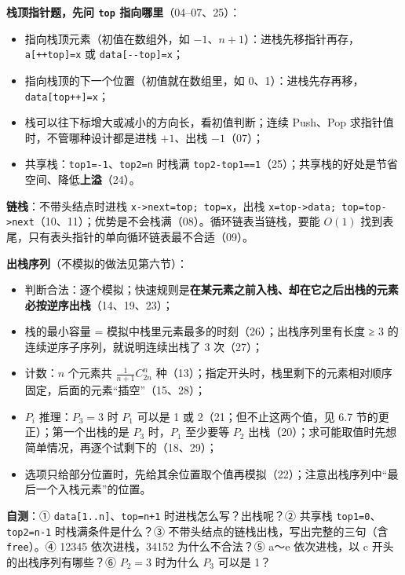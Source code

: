 \documentclass[10.5pt,a4paper,oneside]{article}
\newcommand{\hlred}[1]{\textcolor{wdred}{\bfseries #1}}
\providecommand{\tightlist}{\setlength{\itemsep}{2pt}\setlength{\parskip}{0pt}}
\begin{document}
\begin{summarybox}

\textbf{栈顶指针题，先问 \texttt{top} 指向哪里}（04--07、25）：

\begin{itemize}
\tightlist
\item
  指向栈顶元素（初值在数组外，如
  \(-1\)、\(n+1\)）：进栈先移指针再存，\texttt{a{[}++top{]}=x} 或
  \texttt{data{[}-\/-top{]}=x}；
\item
  指向栈顶的下一个位置（初值就在数组里，如
  0、1）：进栈先存再移，\texttt{data{[}top++{]}=x}；
\item
  栈可以往下标增大或减小的方向长，看初值判断；连续 Push、Pop
  求指针值时，不管哪种设计都是进栈 \(+1\)、出栈 \(-1\)（07）；
\item
  共享栈：\texttt{top1=-1}、\texttt{top2=n} 时栈满
  \texttt{top2-top1==1}（25）；共享栈的好处是节省空间、降低\textbf{上溢}（24）。
\end{itemize}

\textbf{链栈}：不带头结点时进栈
\texttt{x-\textgreater{}next=top;\ top=x}，出栈
\texttt{x=top-\textgreater{}data;\ top=top-\textgreater{}next}（10、11）；优势是不会栈满（08）。循环链表当链栈，要能
\(O(1)\) 找到表尾，只有表头指针的单向循环链表最不合适（09）。

\textbf{出栈序列}（不模拟的做法见第六节）：

\begin{itemize}
\tightlist
\item
  判断合法：逐个模拟；快速规则是\hlred{在某元素之前入栈、却在它之后出栈的元素必按逆序出栈}（14、19、23）；
\item
  栈的最小容量 = 模拟中栈里元素最多的时刻（26）；出栈序列里有长度 ≥ 3
  的连续逆序子序列，就说明连续出栈了 3 次（27）；
\item
  计数：\(n\) 个元素共 \(\frac{1}{n+1}C_{2n}^{n}\)
  种（13）；指定开头时，栈里剩下的元素相对顺序固定，后面的元素“插空”（15、28）；
\item
  \(P_i\) 推理：\(P_3=3\) 时 \(P_1\) 可以是 1 或
  2（21；但不止这两个值，见 6.7 节的更正）；第一个出栈的是 \(P_3\)
  时，\(P_1\) 至少要等 \(P_2\)
  出栈（20）；求可能取值时先想简单情况，再逐个试剩下的（18、29）；
\item
  选项只给部分位置时，先给其余位置取个值再模拟（22）；注意出栈序列中“最后一个入栈元素”的位置。
\end{itemize}

\textbf{自测}：① \texttt{data{[}1..n{]}}、\texttt{top=n+1}
时进栈怎么写？出栈呢？② 共享栈 \texttt{top1=0}、\texttt{top2=n-1}
时栈满条件是什么？③ 不带头结点的链栈出栈，写出完整的三句（含
\texttt{free}）。④ 12345 依次进栈，34152 为什么不合法？⑤ a～e
依次进栈，以 c 开头的出栈序列有哪些？⑥ \(P_2=3\) 时为什么 \(P_3\) 可以是
1？

\end{summarybox}
\end{document}
